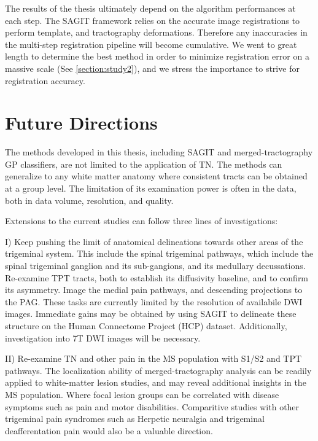 The results of the thesis ultimately depend on the algorithm performances at each step. The SAGIT framework relies on the accurate image registrations to perform template, and tractography deformations. Therefore any inaccuracies in the multi-step registration pipeline will become cumulative. We went to great length to determine the best method in order to minimize registration error on a massive scale (See \ref{section:study2}), and we stress the importance to strive for registration accuracy. 



\section{Future Directions}

The methods developed in this thesis, including SAGIT and merged-tractography GP classifiers,  are not limited to the application of TN. The methods can generalize to any white matter anatomy where consistent tracts can be obtained at a group level. The limitation of its examination power is often in the data, both in data volume, resolution, and quality.

Extensions to the current studies can follow three lines of investigations:

I) Keep pushing the limit of anatomical delineations towards other areas of the trigeminal system. This include the spinal trigeminal pathways, which include the spinal trigeminal ganglion and its sub-gangions, and its medullary decussations. Re-examine TPT tracts, both to establish its diffusivity baseline, and to confirm its asymmetry. Image the medial pain pathways, and descending projections to the PAG. These tasks are currently limited by the resolution of availabile DWI images. Immediate gains may be obtained by using SAGIT to delineate these structure on the Human Connectome Project (HCP) dataset. Additionally, investigation into 7T DWI images will be necessary. 

II) Re-examine TN and other pain in the MS population with S1/S2 and TPT pathways. The localization ability of merged-tractography analysis can be readily applied to white-matter lesion studies, and may reveal additional insights in the MS population. Where focal lesion groups can be correlated with disease symptoms such as pain and motor disabilities. Comparitive studies with other trigeminal pain syndromes such as Herpetic neuralgia and trigeminal deafferentation pain would also be a valuable direction.

